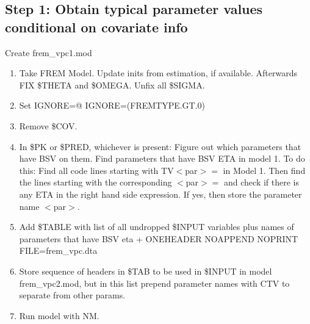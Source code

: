 \subsection{Step 1: Obtain typical parameter values conditional on covariate info}
Create frem\_vpc1.mod

\begin{enumerate}
	\item Take FREM Model. Update inits from estimation, if available. Afterwards FIX \$THETA and \$OMEGA. Unfix all \$SIGMA.
	\item Set IGNORE=@ IGNORE=(FREMTYPE.GT.0)
	\item Remove \$COV.
	\item In \$PK or \$PRED, whichever is present:
Figure out which parameters that have BSV %
on them.
Find parameters
that have BSV ETA %
in model 1.
To do this: Find all code lines starting with TV$<$par$>=$ in Model 1. Then find the lines starting with the corresponding $<$par$>=$ and
check if there is any ETA in the right hand side expression. If yes, then store the parameter name $<$par$>$.  
	\item Add \$TABLE with list of all undropped \$INPUT variables plus names of parameters that have BSV eta  + ONEHEADER NOAPPEND NOPRINT FILE=frem\_vpc.dta
	\item Store sequence of headers in \$TAB to be used in \$INPUT in model frem\_vpc2.mod, but in this list prepend parameter names with CTV to separate from other params.
	\item Run model with NM.
\end{enumerate}

